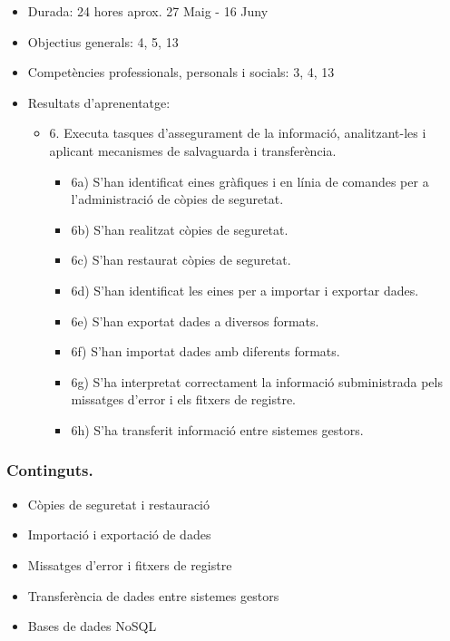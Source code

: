 \documentclass[catalan, a4paper, 12pt, titlepage]{article}
\begin{document}
  \begin{itemize}
	\item Durada: 24 hores aprox. 27 Maig - 16 Juny
	\item Objectius generals: 4, 5, 13
	\item Competències professionals, personals i socials: 3, 4, 13
	\item Resultats d'aprenentatge: 
		\begin{itemize}
			\item 6. Executa tasques d'assegurament de la informació, analitzant-les i aplicant mecanismes de salvaguarda i transferència.
				\begin{itemize}
					\item 6a) S'han identificat eines gràfiques i en línia de comandes per a l'administració de còpies de seguretat.
					\item 6b) S'han realitzat còpies de seguretat.
					\item 6c) S'han restaurat còpies de seguretat.
					\item 6d) S'han identificat les eines per a importar i exportar dades.
					\item 6e) S'han exportat dades a diversos formats.
					\item 6f) S'han importat dades amb diferents formats.
					\item 6g) S'ha interpretat correctament la informació subministrada pels missatges d'error i els fitxers de registre.
					\item 6h) S'ha transferit informació entre sistemes gestors.
				\end{itemize}
		\end{itemize}
  \end{itemize}

  \subsubsection{Continguts.}
  \begin{itemize}
	\item Còpies de seguretat i restauració
	\item Importació i exportació de dades
	\item Missatges d'error i fitxers de registre
	\item Transferència de dades entre sistemes gestors
	\item Bases de dades NoSQL
  \end{itemize}
\end{document}
